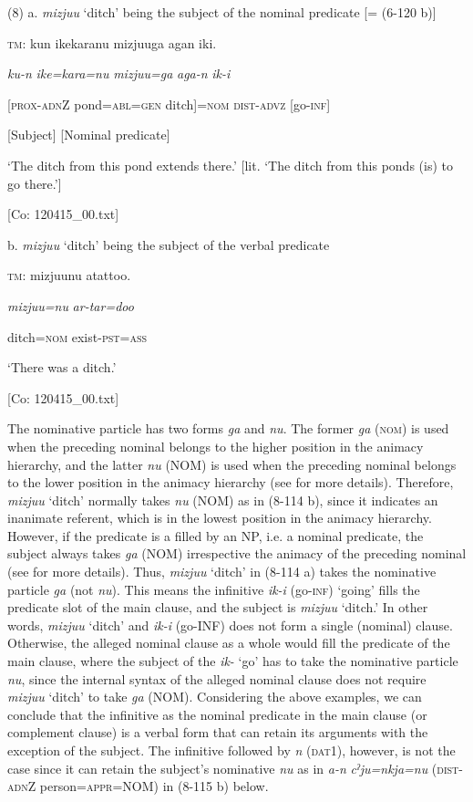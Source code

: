 (8)  a. \textit{mizjuu} ‘ditch’ being the subject of the nominal predicate [= (6-120 b)]

  \textsc{tm}:  kun  {\textbar}ike{\textbar}karanu  mizjuuga  agan  iki.

    \textit{ku-n}  \textit{ike=kara=nu}  \textit{mizjuu=ga}  \textit{aga-n}  \textit{ik-i}

    [\textsc{prox}-\textsc{adn}Z  pond=\textsc{abl}=\textsc{gen}  ditch]=\textsc{nom}  \textsc{dist}-\textsc{advz}  [go-\textsc{inf}]

    [Subject]    [Nominal predicate]

    ‘The ditch from this pond extends there.’ [lit. ‘The ditch from this ponds (is) to go there.’]

    [Co: 120415\_00.txt]

  b. \textit{mizjuu} ‘ditch’ being the subject of the verbal predicate

  \textsc{tm}:  mizjuunu  atattoo.

    \textit{mizjuu=nu}  \textit{ar-tar=doo}      

    ditch=\textsc{nom}  exist-\textsc{pst}=\textsc{ass}

    ‘There was a ditch.’

    [Co: 120415\_00.txt]

The nominative particle has two forms \textit{ga} and \textit{nu}. The former \textit{ga} (\textsc{nom}) is used when the preceding nominal belongs to the higher position in the animacy hierarchy, and the latter \textit{nu} (NOM) is used when the preceding nominal belongs to the lower position in the animacy hierarchy (see  for more details). Therefore, \textit{mizjuu} ‘ditch’ normally takes \textit{nu} (NOM) as in (8-114 b), since it indicates an inanimate referent, which is in the lowest position in the animacy hierarchy. However, if the predicate is a filled by an NP, i.e. a nominal predicate, the subject always takes \textit{ga} (NOM) irrespective the animacy of the preceding nominal (see  for more details). Thus, \textit{mizjuu} ‘ditch’ in (8-114 a) takes the nominative particle \textit{ga} (not \textit{nu}). This means the infinitive \textit{ik-i} (go-\textsc{inf}) ‘going’ fills the predicate slot of the main clause, and the subject is \textit{mizjuu} ‘ditch.’ In other words, \textit{mizjuu} ‘ditch’ and \textit{ik-i} (go-INF) does not form a single (nominal) clause. Otherwise, the alleged nominal clause as a whole would fill the predicate of the main clause, where the subject of the \textit{ik-} ‘go’ has to take the nominative particle \textit{nu}, since the internal syntax of the alleged nominal clause does not require \textit{mizjuu} ‘ditch’ to take \textit{ga} (NOM). Considering the above examples, we can conclude that the infinitive as the nominal predicate in the main clause (or complement clause) is a verbal form that can retain its arguments with the exception of the subject. The infinitive followed by \textit{n} (\textsc{dat}1), however, is not the case since it can retain the subject’s nominative \textit{nu} as in \textit{a-n} \textit{cˀju=nkja=nu} (\textsc{dist}-\textsc{adn}Z person=\textsc{appr}=NOM) in (8-115 b) below.


